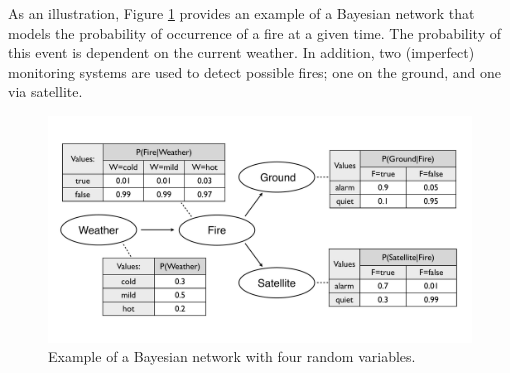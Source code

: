 As an illustration, Figure \ref{fig:plainbn} provides an example of a Bayesian network that models the probability of occurrence of a fire at a given time.  The probability of this event is dependent on the current weather.  In addition, two (imperfect) monitoring systems are used to detect possible fires; one on the ground, and one via satellite.  

\begin{figure}[ht]
\centering
\includegraphics[scale=0.25]{imgs/plainbn.pdf}
\caption{Example of a Bayesian network with four random variables.}
\label{fig:plainbn}
\end{figure}


